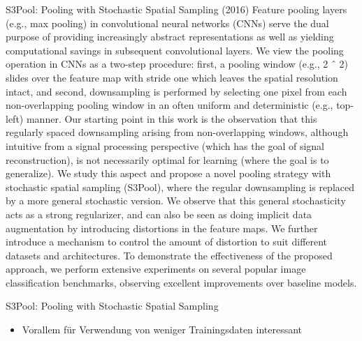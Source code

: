 \documentclass[10pt]{beamer}
\begin{document}
\begin{frame}{S3Pool: Pooling with Stochastic Spatial Sampling (2016)}
 Feature pooling layers (e.g., max pooling) in convolutional neural networks (CNNs) serve the dual purpose of providing increasingly abstract representations as well as yielding computational savings in subsequent convolutional layers. We view the pooling operation in CNNs as a two-step procedure: first, a pooling window (e.g., 2 ˆ 2) slides over the feature map with stride one which leaves the spatial resolution intact, and second, downsampling is performed by selecting one pixel from each non-overlapping pooling window in an often uniform and deterministic (e.g., top-left) manner. Our starting point in this work is the observation that this regularly spaced downsampling arising from non-overlapping windows, although intuitive from a signal processing perspective (which has the goal of signal reconstruction), is not necessarily optimal for learning (where the goal is to generalize). We study this aspect and propose a novel pooling strategy with stochastic spatial sampling (S3Pool), where the regular downsampling is replaced by a more general stochastic version. We observe that this general stochasticity acts as a strong regularizer, and can also be seen as doing implicit data augmentation by introducing distortions in the feature maps. We further introduce a mechanism to control the amount of distortion to suit different datasets and architectures. To demonstrate the effectiveness of the proposed approach, we perform extensive experiments on several popular image classification benchmarks, observing excellent improvements over baseline models.
\end{frame}

\begin{frame}{S3Pool: Pooling with Stochastic Spatial Sampling}
 \begin{itemize}
  \item Vorallem für Verwendung von weniger Trainingsdaten interessant
 \end{itemize}
\end{frame}
\end{document}
